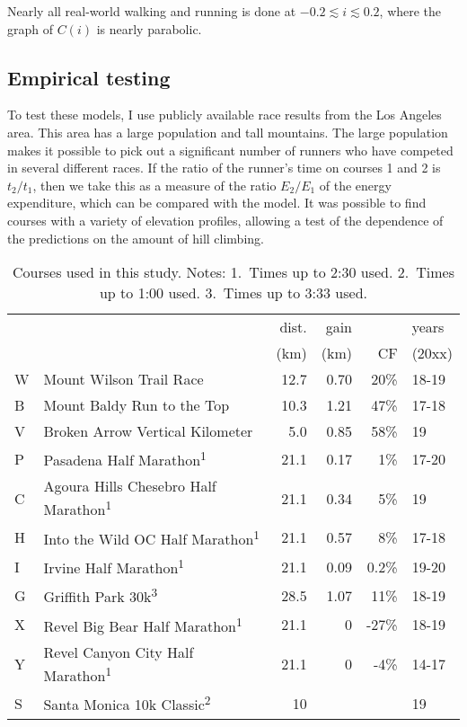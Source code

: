\documentclass[10pt,letterpaper]{article}
\begin{document}
Nearly all real-world walking and running is
done at $-0.2 \lesssim i \lesssim 0.2$, where the graph of $C(i)$ is nearly parabolic.

\subsection*{Empirical testing}

To test these models, I use publicly available race results from the Los Angeles area.
This area has a large population and tall mountains. The large population makes it possible
to pick out a significant number of runners who have competed in several different races.
If the ratio of the runner's time on courses 1 and 2 is $t_2/t_1$, then we take this
as a measure of the ratio $E_2/E_1$ of the energy expenditure, which can be compared with
the model. It was possible to find courses with a variety of elevation profiles, allowing
a test of the dependence of the predictions on the amount of hill climbing.

\begin{table}[h]\label{table:courses}
\caption{Courses used in this study. Notes: 1.~Times up to 2:30 used. 2.~Times up to 1:00 used.
3.~Times up to 3:33 used.}
\begin{tabular}{lp{60mm}rrrl}
                 &       & dist.  & gain &  &  years \\
                 &       & (km)      &  (km) & CF & (20xx) \\
W & Mount Wilson Trail Race         & 12.7 & 0.70 & 20\%        & 18-19\\
B & Mount Baldy Run to the Top      & 10.3 & 1.21 & 47\%        & 17-18\\
V & Broken Arrow Vertical Kilometer & 5.0  & 0.85 & 58\%        & 19 \\
P & Pasadena Half Marathon\textsuperscript{1}
                                    & 21.1 & 0.17 & 1\%         & 17-20 \\
C & Agoura Hills Chesebro Half Marathon\textsuperscript{1}
                                    & 21.1 & 0.34 & 5\%     & 19 \\
H & Into the Wild OC Half Marathon\textsuperscript{1}
                                    & 21.1 & 0.57 & 8\% & 17-18\\
I & Irvine Half Marathon\textsuperscript{1}
                                    & 21.1 & 0.09 & 0.2\% & 19-20\\
G & Griffith Park 30k\textsuperscript{3}
                                    & 28.5 & 1.07 & 11\%        & 18-19 \\
X & Revel Big Bear Half Marathon\textsuperscript{1}
                                    & 21.1 & 0    & -27\% & 18-19 \\
Y & Revel Canyon City Half Marathon\textsuperscript{1}
                                    & 21.1 & 0    & -4\% & 14-17\\
S & Santa Monica 10k Classic\textsuperscript{2}        & 10 & & & 19\\
\end{tabular}
\label{table:courses}
\end{table}
\end{document}
